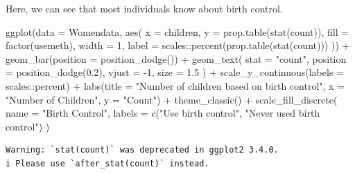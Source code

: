 \documentclass[
  letterpaper,
  DIV=11,
  numbers=noendperiod]{scrartcl}
\newenvironment{Shaded}{\begin{snugshade}}{\end{snugshade}}
\newcommand{\AttributeTok}[1]{\textcolor[rgb]{0.40,0.45,0.13}{#1}}
\newcommand{\DecValTok}[1]{\textcolor[rgb]{0.68,0.00,0.00}{#1}}
\newcommand{\FloatTok}[1]{\textcolor[rgb]{0.68,0.00,0.00}{#1}}
\newcommand{\FunctionTok}[1]{\textcolor[rgb]{0.28,0.35,0.67}{#1}}
\newcommand{\NormalTok}[1]{\textcolor[rgb]{0.00,0.23,0.31}{#1}}
\newcommand{\SpecialCharTok}[1]{\textcolor[rgb]{0.37,0.37,0.37}{#1}}
\newcommand{\StringTok}[1]{\textcolor[rgb]{0.13,0.47,0.30}{#1}}
\begin{document}
Here, we can see that most individuals know about birth control.

\begin{Shaded}
\begin{Highlighting}[]
\FunctionTok{ggplot}\NormalTok{(}\AttributeTok{data =}\NormalTok{ Womendata,}
       \FunctionTok{aes}\NormalTok{(}
         \AttributeTok{x =}\NormalTok{ children,}
         \AttributeTok{y =} \FunctionTok{prop.table}\NormalTok{(}\FunctionTok{stat}\NormalTok{(count)),}
         \AttributeTok{fill =} \FunctionTok{factor}\NormalTok{(usemeth), }\AttributeTok{width =} \DecValTok{1}\NormalTok{,}
         \AttributeTok{label =}\NormalTok{ scales}\SpecialCharTok{::}\FunctionTok{percent}\NormalTok{(}\FunctionTok{prop.table}\NormalTok{(}\FunctionTok{stat}\NormalTok{(count)))}
\NormalTok{       )) }\SpecialCharTok{+}
  \FunctionTok{geom\_bar}\NormalTok{(}\AttributeTok{position =} \FunctionTok{position\_dodge}\NormalTok{()) }\SpecialCharTok{+}
  \FunctionTok{geom\_text}\NormalTok{(}
    \AttributeTok{stat =} \StringTok{"count"}\NormalTok{,}
    \AttributeTok{position =} \FunctionTok{position\_dodge}\NormalTok{(}\FloatTok{0.2}\NormalTok{),}
    \AttributeTok{vjust =} \SpecialCharTok{{-}}\DecValTok{1}\NormalTok{,}
    \AttributeTok{size =} \FloatTok{1.5}
\NormalTok{  ) }\SpecialCharTok{+} \FunctionTok{scale\_y\_continuous}\NormalTok{(}\AttributeTok{labels =}\NormalTok{ scales}\SpecialCharTok{::}\NormalTok{percent) }\SpecialCharTok{+}
  \FunctionTok{labs}\NormalTok{(}\AttributeTok{title =} \StringTok{"Number of children based on birth control"}\NormalTok{,}
       \AttributeTok{x =} \StringTok{"Number of Children"}\NormalTok{,}
       \AttributeTok{y =} \StringTok{"Count"}\NormalTok{) }\SpecialCharTok{+}
  \FunctionTok{theme\_classic}\NormalTok{() }\SpecialCharTok{+}
  \FunctionTok{scale\_fill\_discrete}\NormalTok{(}
    \AttributeTok{name =} \StringTok{"Birth Control"}\NormalTok{,}
    \AttributeTok{labels =} \FunctionTok{c}\NormalTok{(}\StringTok{"Use birth control"}\NormalTok{, }\StringTok{"Never used birth control"}\NormalTok{)}
\NormalTok{  )}
\end{Highlighting}
\end{Shaded}

\begin{verbatim}
Warning: `stat(count)` was deprecated in ggplot2 3.4.0.
i Please use `after_stat(count)` instead.
\end{verbatim}
\end{document}
